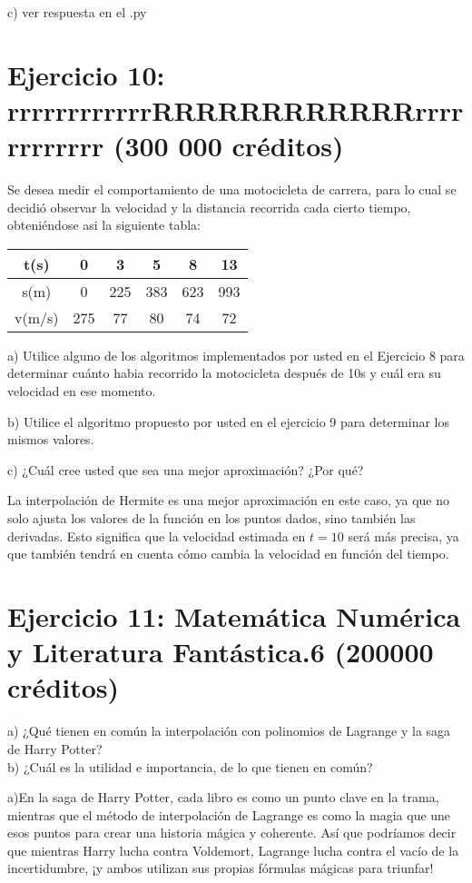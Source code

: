 \documentclass[a4paper,12pt]{article}
\begin{document}
c) ver respuesta en el .py

\section*{Ejercicio 10: rrrrrrrrrrrrRRRRRRRRRRRRrrrrrrrrrrrr (300 000 créditos)}

Se desea medir el comportamiento de una motocicleta de carrera, para lo cual se decidió observar
la velocidad y la distancia recorrida cada cierto tiempo, obteniéndose asi la siguiente tabla:

\begin{table}[h]
\centering
\begin{tabular}{|c||c|c|c|c|c|}
\hline
t(s)  &  0 &  3 & 5 & 8 & 13 \\
\hline
s(m) & 0 & 225 &383 & 623 & 993 \\
\hline
v(m/s) & 275 & 77 & 80 & 74 & 72 \\
\hline
\end{tabular}
\end{table}

a) Utilice alguno de los algoritmos implementados por usted en el Ejercicio 8 para determinar
cuánto habia recorrido la motocicleta después de 10s y cuál era su velocidad en ese momento.

b) Utilice el algoritmo propuesto por usted en el ejercicio 9 para determinar los mismos valores.

c) ¿Cuál cree usted que sea una mejor aproximación? ¿Por qué?

La interpolación de Hermite es una mejor aproximación en este caso, ya que no solo ajusta los valores de la función en los puntos dados, sino también las derivadas. Esto significa que la velocidad estimada en \( t = 10 \) será más precisa, ya que también tendrá en cuenta cómo cambia la velocidad en función del tiempo.
\section*{Ejercicio 11: Matemática Numérica y Literatura Fantástica.6 (200000
créditos)
}
a) ¿Qué tienen en común la interpolación con polinomios de Lagrange y la saga de Harry Potter?\\
b) ¿Cuál es la utilidad e importancia, de lo que tienen en común?

a)En la saga de Harry Potter, cada libro es como un punto clave en la trama, mientras que el método de interpolación de Lagrange es como la magia que une esos puntos para crear una historia mágica y coherente. Así que podríamos decir que mientras Harry lucha contra Voldemort, Lagrange lucha contra el vacío de la incertidumbre, ¡y ambos utilizan sus propias fórmulas mágicas para triunfar!
\end{document}
